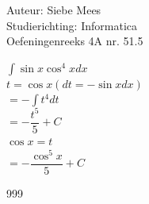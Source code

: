 \documentclass[a4paper]{article}
\begin{document}
  
\noindent \large Auteur: Siebe Mees \\
\noindent \large Studierichting: Informatica\\
\noindent \large Oefeningenreeks 4A nr. 51.5\\

\medskip

\normalsize

$ \displaystyle\int \sin x \cos^4 x dx $\\

$ t = \cos x \left( dt = - \sin x dx \right)$\\

$ = - \displaystyle\int t^4 dt $\\

$ = - \dfrac{t^5}{5} + C $\\

$ \cos x = t $\\

$ = - \dfrac{\cos^5 x}{5} + C $\\

\begin{thebibliography}{999}
\end{thebibliography}
\end{document}
